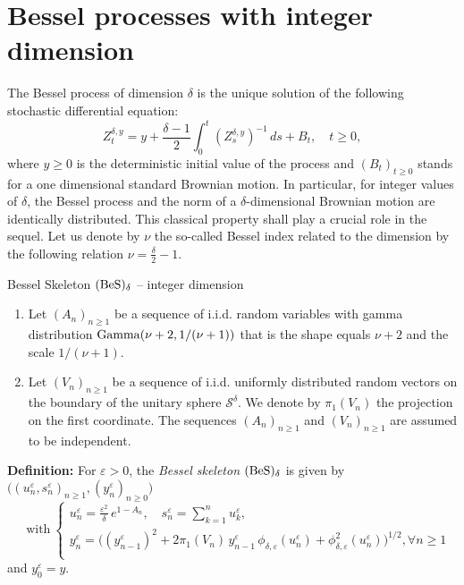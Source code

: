\documentclass[12pt]{article}
\newcommand{\ds}{\displaystyle}
\numberwithin{equation}{section}
\begin{document}
\section{Bessel processes with integer dimension}\label{sec:integer}
The Bessel process of dimension $\delta$ is the unique solution of the following stochastic differential equation:
\begin{equation}
\label{eq:def:Be}
Z_t^{\delta,y}=y+\frac{\delta-1}{2}\int_{0}^t (Z_s^{\delta,y})^{-1}\,ds+B_t,\quad t\ge 0,
\end{equation}
where $y\ge 0$ is the deterministic initial value of the process and $(B_t)_{t\ge 0}$ stands for a one dimensional standard Brownian motion. In particular, for integer values of $\delta$, the Bessel process and the norm of a $\delta$-dimensional Brownian motion are identically distributed. This classical property shall play a crucial role in the sequel. Let us denote by $\nu$ the so-called Bessel index related to the dimension by the following relation $\nu=\frac{\delta}{2}-1$.
\begin{framed}
\centerline{\sc Bessel Skeleton $({\rm BeS})_\delta$ -- integer dimension}

\vspace*{0.2cm}
\begin{enumerate}
\item Let $(A_n)_{n\ge 1}$  be a sequence of i.i.d. random variables with gamma distribution ${\rm Gamma}(\nu+2,1/(\nu+1))$ that is the shape equals $\nu+2$ and the scale $1/(\nu+1)$.
\item Let $(V_n)_{n\ge 1}$ be a sequence of i.i.d. uniformly distributed random vectors on the boundary of the unitary sphere $\mathcal{S}^\delta$. We denote by $\pi_1(V_n)$ the projection on
the first coordinate. The sequences 
 $(A_n)_{n\ge 1}$ and $(V_n)_{n\ge 1}$ are assumed to be independent. 
\end{enumerate}


\noindent
{\bf  Definition:} For $\varepsilon>0$, the \emph{Bessel skeleton} $({\rm BeS})_\delta$ is given by $\Big((u_n^\varepsilon,s_n^\varepsilon)_{n\ge 1},(y_n^\varepsilon)_{n\ge 0}\Big)$
\[
\quad\mbox{with}\  \left\{
\begin{array}{l}
u_n^\varepsilon=\frac{\varepsilon^2}{\delta} \,e^{1-A_n},\quad 
 s^\varepsilon_n=\ds\sum_{k=1}^nu_k^\varepsilon,\\[18pt]
  y_n^\varepsilon=\Big((y_{n-1}^\varepsilon)^2+ 2\pi_1(V_n)\,y_{n-1}^\varepsilon \,\phi_{\delta,\varepsilon}( u_{n}^\varepsilon)+\phi_{\delta,\varepsilon}^2( u_{n}^\varepsilon)\Big)^{1/2}, \forall n\ge 1 \\
 \end{array}
 \right.
\]
and $y_0^\varepsilon=y$.

\end{framed}
\end{document}

